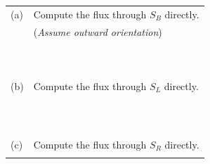 \documentclass[12pt]{amsart}
\numberwithin{equation}{section}
\begin{document}
{{\setlength{\extrarowheight}{0.1cm}
\begin{tabular}{p{0.35cm}p{20.6cm}}
	(a) & Compute the flux through $S_B$ directly.\\
	& \hspace{12.5cm} ({\em Assume outward orientation})\\
	&\\&\\&\\&\\&\\&\\&\\&\\&\\&\\
	(b) & Compute the flux through $S_L$ directly. \\
	&\\&\\&\\&\\&\\&\\&\\&\\&\\&\\&\\
	(c) & Compute the flux through $S_R$ directly. \\
	&\\
\end{tabular}}

\thispagestyle{empty}
\newpage
\thispagestyle{empty}

}
\end{document}
